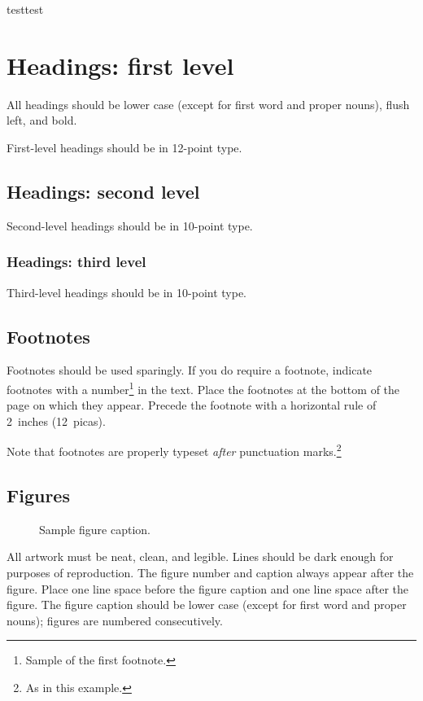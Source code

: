 \documentclass[twocolumn]{article}
\begin{document}
testtest







\section{Headings: first level}
\label{headings}

All headings should be lower case (except for first word and proper nouns),
flush left, and bold.

First-level headings should be in 12-point type.

\subsection{Headings: second level}

Second-level headings should be in 10-point type.

\subsubsection{Headings: third level}

Third-level headings should be in 10-point type.

\subsection{Footnotes}

Footnotes should be used sparingly.  If you do require a footnote, indicate
footnotes with a number\footnote{Sample of the first footnote.} in the
text. Place the footnotes at the bottom of the page on which they appear.
Precede the footnote with a horizontal rule of 2~inches (12~picas).

Note that footnotes are properly typeset \emph{after} punctuation
marks.\footnote{As in this example.}

\subsection{Figures}

\begin{figure}
  \centering
  \fbox{\rule[-.5cm]{0cm}{4cm} \rule[-.5cm]{4cm}{0cm}}
  \caption{Sample figure caption.}
\end{figure}

All artwork must be neat, clean, and legible. Lines should be dark enough for
purposes of reproduction. The figure number and caption always appear after the
figure. Place one line space before the figure caption and one line space after
the figure. The figure caption should be lower case (except for first word and
proper nouns); figures are numbered consecutively.
\end{document}

